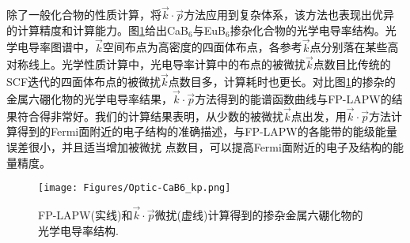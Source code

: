 除了一般化合物的性质计算，将$\vec k\cdot\vec p$方法应用到复杂体系，该方法也表现出优异的计算精度和计算能力。图\ref{fig:Band_Hexaborides-kp}给出CaB$_6$与EuB$_6$掺杂化合物的光学电导率结构。光学电导率图谱中，$\vec k$空间布点为高密度的四面体布点，各参考$\vec k$点分别落在某些高对称线上。光学性质计算中，光电导率计算中的布点的被微扰$\vec k$点数目比传统的\textrm{SCF}迭代的四面体布点的被微扰$\vec k$点数目多，计算耗时也更长。对比图\ref{fig:Band_Hexaborides-kp}的掺杂的金属六硼化物的光学电导率结果，$\vec k\cdot\vec p$方法得到的能谱函数曲线与\textrm{FP-LAPW}的结果符合得非常好。我们的计算结果表明，从少数的被微扰$\vec k$点出发，用$\vec k\cdot\vec p$方法计算得到的\textrm{Fermi}面附近的电子结构的准确描述，与\textrm{FP-LAPW}的各能带的能级能量误差很小，并且适当增加被微扰 点数目，可以提高\textrm{Fermi}面附近的电子及结构的能量精度。
\begin{figure}[ht!]
\centering
\texttt{[image: Figures/Optic-CaB6\_kp.png]}
\caption{\small \textrm{FP-LAPW}(实线)和$\vec k\cdot\vec p$微扰(虚线)计算得到的掺杂金属六硼化物的光学电导率结构.}%
\label{fig:Band_Hexaborides-kp}
\end{figure}
